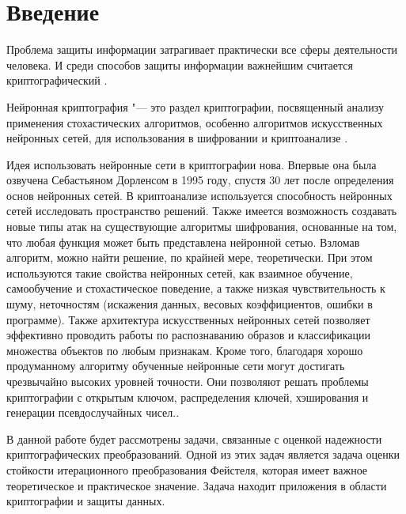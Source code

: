   \chapter*{Введение}
  \label{c:intro}
  
Проблема защиты информации затрагивает практически все сферы деятельности человека. И среди способов защиты информации важнейшим считается криптографический \cite{crypto}.

\bigskip

Нейронная криптография "--- это раздел криптографии, посвященный анализу применения стохастических алгоритмов, особенно алгоритмов искусственных нейронных сетей, для использования в шифровании и криптоанализе \cite{crypto_nn}.

\bigskip

Идея использовать нейронные сети в криптографии нова. Впервые она была озвучена Себастьяном Дорленсом в 1995 году, спустя 30 лет после
определения основ нейронных сетей. В криптоанализе используется способность нейронных сетей исследовать пространство решений. Также
имеется возможность создавать новые типы атак на существующие алгоритмы шифрования, основанные на том, что любая функция может быть
представлена нейронной сетью. Взломав алгоритм, можно найти решение, по крайней мере, теоретически. При этом используются такие свойства
нейронных сетей, как взаимное обучение, самообучение и стохастическое поведение, а также низкая чувствительность к шуму, неточностям (искажения
данных, весовых коэффициентов, ошибки в программе). Также архитектура искусственных нейронных сетей позволяет эффективно проводить работы по распознаванию образов и классификации множества объектов по любым признакам. Кроме того, благодаря хорошо продуманному алгоритму обученные нейронные сети могут достигать чрезвычайно высоких уровней точности. Они позволяют решать проблемы криптографии с открытым ключом, распределения ключей,
хэширования и генерации псевдослучайных чисел.\cite{encr_nn}.

\bigskip

В данной работе будет рассмотрены задачи, связанные с оценкой надежности криптографических преобразований. Одной из этих задач является задача оценки стойкости итерационного преобразования Фейстеля, которая имеет важное теоретическое и практическое значение. Задача находит приложения в области криптографии и защиты данных.